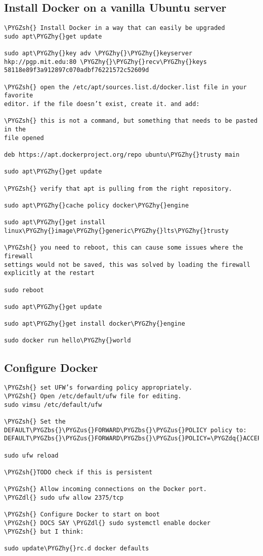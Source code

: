\documentclass[letterpaper,10pt,english]{sphinxmanual}
\def\PYGZbs{\char`\\}
\def\PYGZus{\char`\_}
\def\PYGZsh{\char`\#}
\def\PYGZdl{\char`\$}
\def\PYGZhy{\char`\-}
\def\PYGZdq{\char`\"}
\begin{document}
\subsection{Install Docker on a vanilla Ubuntu server}
\label{admin:install-docker-on-a-vanilla-ubuntu-server}
\begin{Verbatim}[commandchars=\\\{\}]
\PYGZsh{} Install Docker in a way that can easily be upgraded
sudo apt\PYGZhy{}get update

sudo apt\PYGZhy{}key adv \PYGZhy{}\PYGZhy{}keyserver hkp://pgp.mit.edu:80 \PYGZhy{}\PYGZhy{}recv\PYGZhy{}keys
58118e89f3a912897c070adbf76221572c52609d

\PYGZsh{} open the /etc/apt/sources.list.d/docker.list file in your favorite
editor. if the file doesn’t exist, create it. and add:

\PYGZsh{} this is not a command, but something that needs to be pasted in the
file opened

deb https://apt.dockerproject.org/repo ubuntu\PYGZhy{}trusty main

sudo apt\PYGZhy{}get update

\PYGZsh{} verify that apt is pulling from the right repository.

sudo apt\PYGZhy{}cache policy docker\PYGZhy{}engine

sudo apt\PYGZhy{}get install linux\PYGZhy{}image\PYGZhy{}generic\PYGZhy{}lts\PYGZhy{}trusty

\PYGZsh{} you need to reboot, this can cause some issues where the firewall
settings would not be saved, this was solved by loading the firewall
explicitly at the restart

sudo reboot

sudo apt\PYGZhy{}get update

sudo apt\PYGZhy{}get install docker\PYGZhy{}engine

sudo docker run hello\PYGZhy{}world
\end{Verbatim}


\subsection{Configure Docker}
\label{admin:configure-docker}
\begin{Verbatim}[commandchars=\\\{\}]
\PYGZsh{} set UFW’s forwarding policy appropriately.
\PYGZsh{} Open /etc/default/ufw file for editing.
sudo vimsu /etc/default/ufw

\PYGZsh{} Set the DEFAULT\PYGZbs{}\PYGZus{}FORWARD\PYGZbs{}\PYGZus{}POLICY policy to:
DEFAULT\PYGZbs{}\PYGZus{}FORWARD\PYGZbs{}\PYGZus{}POLICY=\PYGZdq{}ACCEPT\PYGZdq{}

sudo ufw reload

\PYGZsh{}TODO check if this is persistent

\PYGZsh{} Allow incoming connections on the Docker port.
\PYGZdl{} sudo ufw allow 2375/tcp

\PYGZsh{} Configure Docker to start on boot
\PYGZsh{} DOCS SAY \PYGZdl{} sudo systemctl enable docker
\PYGZsh{} but I think:

sudo update\PYGZhy{}rc.d docker defaults
\end{Verbatim}
\end{document}
